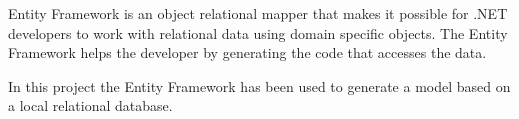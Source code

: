 Entity Framework is an object relational mapper that makes it possible for .NET developers to work with relational data using domain specific objects.
The Entity Framework helps the developer by generating the code that accesses the data.
\cite{entity_framework}

In this project the Entity Framework has been used to generate a model based on a local relational database.